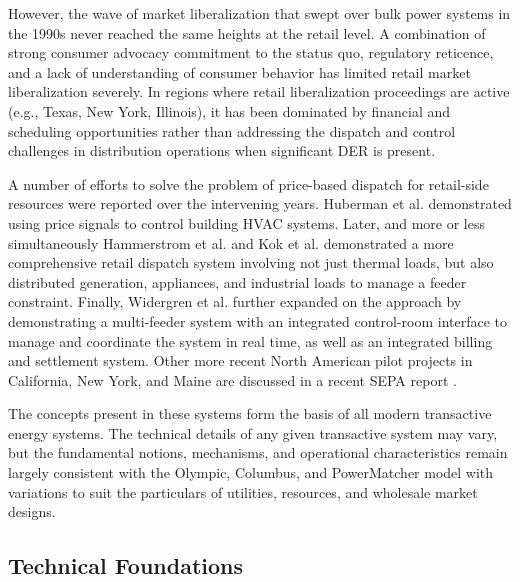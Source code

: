 \documentclass[10pt,twocolumn]{article}
\begin{document}
However, the wave of market liberalization that swept over bulk power systems in the 1990s never reached the same heights at the retail level.  A combination of strong consumer advocacy commitment to the status quo, regulatory reticence, and a lack of understanding of consumer behavior has limited retail market liberalization severely. In regions where retail liberalization proceedings are active (e.g., Texas, New York, Illinois), it has been dominated by financial and scheduling opportunities rather than addressing the dispatch and control challenges in distribution operations when significant DER is present.

A number of efforts to solve the problem of price-based dispatch for retail-side resources were reported over the intervening years.  Huberman et al. \cite{huberman1991} demonstrated using price signals to control building HVAC systems.  Later, and more or less simultaneously Hammerstrom et al. \cite{hammerstrom2007} and Kok et al. \cite{kok2013} demonstrated a more comprehensive retail dispatch system involving not just thermal loads, but also distributed generation, appliances, and industrial loads to manage a feeder constraint.  Finally, Widergren et al. \cite{widergren2014} further expanded on the approach by demonstrating a multi-feeder system with an integrated control-room interface to manage and coordinate the system in real time, as well as an integrated billing and settlement system. Other more recent North American pilot projects in California, New York, and Maine are discussed in a recent SEPA report \cite{sepa2019}.

The concepts present in these systems form the basis of all modern transactive energy systems.  The technical details of any given transactive system may vary, but the fundamental notions, mechanisms, and operational characteristics remain largely consistent with the Olympic, Columbus, and PowerMatcher model with variations to suit the particulars of utilities, resources, and wholesale market designs.

\subsection{Technical Foundations}
\end{document}
